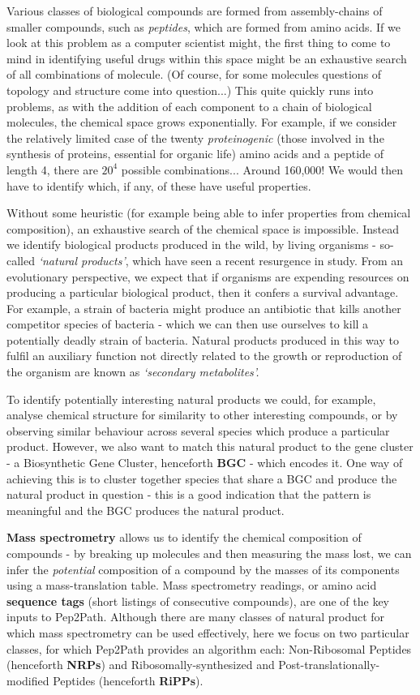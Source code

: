 \documentclass{l4proj}
\newcommand{\cit}[1]{\citep{#1}}
\begin{document}
Various classes of biological compounds are formed from assembly-chains of smaller compounds, such as \textit{peptides}, which are formed from amino acids.
If we look at this problem as a computer scientist might, the first thing to come to mind in identifying useful drugs within this space might be an exhaustive search of all combinations of molecule.
(Of course, for some molecules questions of topology and structure come into question...)
This quite quickly runs into problems, as with the addition of each component to a chain of biological molecules, the chemical space grows exponentially.
For example, if we consider the relatively limited case of the twenty \textit{proteinogenic} (those involved in the synthesis of proteins, essential for organic life) amino acids and a peptide of length 4, there are \(20^4\) possible combinations... Around 160,000! We would then have to identify which, if any, of these have useful properties.

Without some heuristic (for example being able to infer properties from chemical composition), an exhaustive search of the chemical space is impossible.
Instead we identify biological products produced in the wild, by living organisms - so-called \textit{`natural products'}, which have seen a recent resurgence in study. \cit{natural}
From an evolutionary perspective, we expect that if organisms are expending resources on producing a particular biological product, then it confers a survival advantage.
For example, a strain of bacteria might produce an antibiotic that kills another competitor species of bacteria - which we can then use ourselves to kill a potentially deadly strain of bacteria.
Natural products produced in this way to fulfil an auxiliary function not directly related to the growth or reproduction of the organism are known as \textit{`secondary metabolites'.} \cit{metabolomics}

To identify potentially interesting natural products we could, for example, analyse chemical structure for similarity to other interesting compounds, or by observing similar behaviour across several species which produce a particular product. 
However, we also want to match this natural product to the gene cluster - a Biosynthetic Gene Cluster, henceforth \textbf{BGC} - which encodes it.
One way of achieving this is to cluster together species that share a BGC and produce the natural product in question - this is a good indication that the pattern is meaningful and the BGC produces the natural product.

\textbf{Mass spectrometry} allows us to identify the chemical composition of compounds - by breaking up molecules and then measuring the mass lost, we can infer the \textit{potential} composition of a compound by the masses of its components using a mass-translation table. Mass spectrometry readings, or amino acid \textbf{sequence tags} (short listings of consecutive compounds), are one of the key inputs to Pep2Path. Although there are many classes of natural product for which mass spectrometry can be used effectively, \cit{msomics} here we focus on two particular classes, for which Pep2Path provides an algorithm each: Non-Ribosomal Peptides (henceforth \textbf{NRPs}) and Ribosomally-synthesized and Post-translationally-modified Peptides (henceforth \textbf{RiPPs}). 
\end{document}
